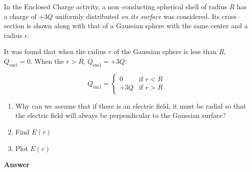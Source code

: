 \documentclass{article}
\begin{document}
In the Enclosed Charge activity, a non--conducting spherical shell of radius $R$ has a charge of $+3Q$ uniformly distributed \emph{on its surface} was considered. Its cross--section is shown along with that of a Gaussian sphere with the same center and a radius $r$.



It was found that when the radius $r$ of the Gaussian sphere is less than $R$, $Q_{\text{encl}}=0$. When the $r>R$, $Q_{\text{encl}}=+3Q$:

$$
   Q_{\text{encl}} = \begin{cases}
     0   &\text{if } r < R \\
     +3Q &\text{if } r > R
   \end{cases}
   $$

\begin{enumerate}

  \item Why can we assume that if there is an electric field, it must be radial so that the electric field will always be perpendicular to the Gaussian surface?

  \item Find $E(r)$

  \item Plot $E(r)$

\end{enumerate}

\newpage

\textbf{Answer}


\end{document}
